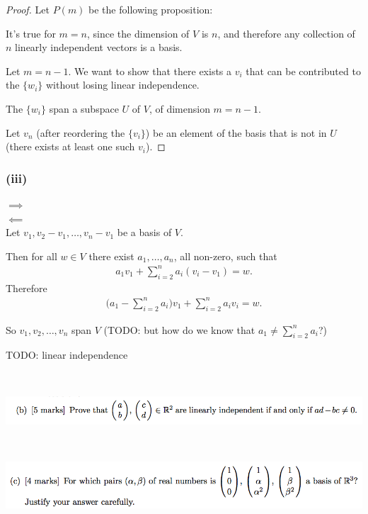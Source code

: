 \documentclass[12pt]{article}
\begin{document}
\begin{proof}
  Let $P(m)$ be the following proposition:

  It's true for $m = n$, since the dimension of $V$ is $n$, and therefore any
  collection of $n$ linearly independent vectors is a basis.

  Let $m = n - 1$. We want to show that there exists a $v_i$ that can be
  contributed to the $\{w_i\}$ without losing linear independence.

  The $\{w_i\}$ span a subspace $U$ of $V$, of dimension $m = n-1$.

  Let $v_n$ (after reordering the $\{v_i\}$) be an element of the basis that is
  not in $U$ (there exists at least one such $v_i$).


\end{proof}

\subsubsection*{(iii)}

$\implies$\\


$\impliedby$\\
Let $v_1, v_2 - v_1, \ldots, v_n - v_1$ be a basis of $V$.

Then for all $w \in V$ there exist $a_1, \ldots, a_n$, all non-zero, such that
\begin{align*}
  a_1v_1 + \sum_{i=2}^n a_i(v_i - v_1) = w.
\end{align*}
Therefore
\begin{align*}
  \Big(a_1 - \sum_{i=2}^na_i\Big)v_1 + \sum_{i=2}^n a_iv_i = w.
\end{align*}

So $v_1, v_2, \ldots, v_n$ span $V$ (TODO: but how do we know that $a_1 \neq \sum_{i=2}^na_i$?)

TODO: linear independence

~\\
\begin{mdframed}
\includegraphics[width=400pt]{img/oxford-prelims-2017-A-1-2.png}
\end{mdframed}

~\\
\begin{mdframed}
\includegraphics[width=400pt]{img/oxford-prelims-2017-A-1-3.png}
\end{mdframed}
\end{document}
